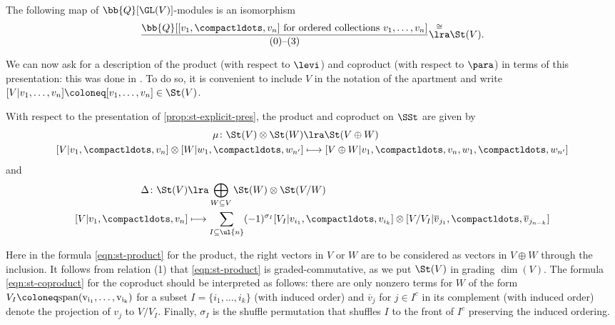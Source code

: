 \documentclass[a4paper]{amsart}
\begin{document}
\begin{proposition}\label{prop:st-explicit-pres} The following map of $\bb{Q}[\GL(V)]$-modules is an isomorphism
\[\frac{\bb{Q}[[v_1,\compactldots,v_n] \text{ for ordered collections $v_1,\ldots,v_n$}]}{\text{(0)--(3)}}\overset{\cong}\lra \St(V).\]
\end{proposition} 

We can now ask for a description of the product (with respect to $\levi$) and coproduct (with respect to $\para$) in terms of this presentation: this was done in \cite{AMP,CharltonRadchenkoRudenko}. To do so, it is convenient to include $V$ in the notation of the apartment and write $[V|v_1,\ldots,v_n] \coloneq [v_1,\ldots,v_n] \in \St(V)$.

\begin{proposition}\label{prop:st-explicit-prod-coprod} With respect to the presentation of \cref{prop:st-explicit-pres}, the product and coproduct on $\SSt$ are given by
\begin{equation}\label{eqn:st-product}\begin{aligned} \mu \colon \St(V) \otimes \St(W) &\lra \St(V \oplus W) \\
[V|v_1,\compactldots,v_n] \otimes [W|w_1,\compactldots,w_{n'}] &\longmapsto [V\oplus W|v_1,\compactldots,v_n,w_1,\compactldots,w_{n'}]\end{aligned}\end{equation}
and \begin{equation}\label{eqn:st-coproduct}\begin{aligned} \Delta \colon \St(V) &\lra \bigoplus_{W \subseteq V} \St(W) \otimes \St(V/W) \\
[V|v_1,\compactldots,v_n] &\longmapsto \sum_{I \subseteq \ul{n}} (-1)^{\sigma_I} [V_I|v_{i_1},\compactldots,v_{i_k}] \otimes [V/V_I|\overline{v}_{j_1},\compactldots,\overline{v}_{j_{n-k}}]\end{aligned}\end{equation}
\end{proposition}

Here in the formula \eqref{eqn:st-product} for the product, the right vectors in $V$ or $W$ are to be considered as vectors in $V \oplus W$ through the inclusion. It follows from relation (1) that \eqref{eqn:st-product} is graded-commutative, as we put $\St(V)$ in grading $\dim(V)$. The formula \eqref{eqn:st-coproduct} for the coproduct should be interpreted as follows: there are only nonzero terms for $W$ of the form $V_I \coloneq \rm{span}(v_{i_1},\ldots,v_{i_k})$ for a subset $I = \{i_1,\ldots,i_k\}$ (with induced order) and $\overline{v}_j$ for $j \in I^c$ in its complement (with induced order) denote the projection of $v_j$ to $V/V_I$. Finally, $\sigma_I$ is the shuffle permutation that shuffles $I$ to the front of $I^c$ preserving the induced ordering. 
\end{document}
